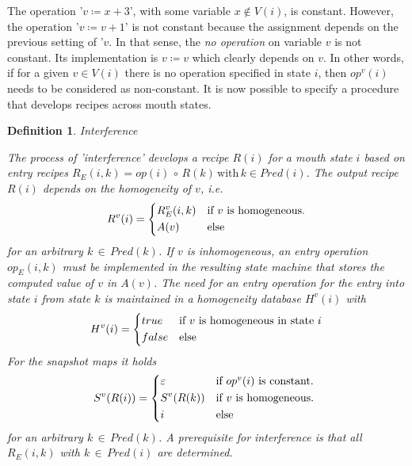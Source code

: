 \documentclass[12pt,a4paper]{scrartcl}
\newtheorem{definition}{Definition}
\begin{document}
The operation '$v\coloneqq x+3$', with some variable $x\notin V(i)$, is
constant.  However, the operation '$v\coloneqq v+1$' is not constant because
the assignment depends on the previous setting of '$v$. In that sense, the
\textit{no operation} on variable $v$ is not constant. Its implementation is
$v\coloneqq v$ which clearly depends on $v$. In other words, if for a given
$v\in V(i)$ there is no operation specified in state $i$, then $op^v(i)$ needs
to be considered as non-constant.  It is now possible to specify a procedure
that develops recipes across mouth states. 
\begin{definition} Interference

The process of 'interference' develops a recipe $R(i)$ for a mouth state $i$
based on entry recipes $R_E(i,k) = op(i)\,\circ\,R(k)\,\mbox{with}\,k \in Pred(i)$.
The output recipe $R(i)$ depends on the homogeneity of $v$, i.e. 
\begin{equation} \label{eq:interference-output}
    R^v(i) = \begin{dcases*}
              R_E^v(i,k) & if $v$ is homogeneous.\\
              A(v)       & else
             \end{dcases*}
\end{equation}
for an arbitrary $k\,\in\,Pred(k)$. If $v$ is inhomogeneous, an entry
operation $op_E(i,k)$ must be implemented in the resulting state machine that
stores the computed value of $v$ in $A(v)$. The need for an entry operation
for the entry into state $i$ from state $k$ is maintained in a homogeneity
database $H^v(i)$ with
\begin{equation} \label{eq:homogeneity-database}
    H^v(i) = \begin{dcases*}
                  true  & if $v$ is homogeneous in state $i$\\
                  false & else
             \end{dcases*}
\end{equation}
For the snapshot maps it holds
\begin{equation} \label{eq:interference-snap-shot-maps}
    S^v(R(i)) = \begin{dcases*}
                  \varepsilon & if $op^v(i)$ is constant. \\
                  S^v(R(k))   & if $v$ is homogeneous.\\
                  i           & else
                \end{dcases*}
\end{equation}
for an arbitrary $k\,\in\,Pred(k)$. A prerequisite for interference is that 
all $R_E(i,k)$ with $k\,\in\,Pred(i)$ are determined.
\end{definition}
\end{document}
